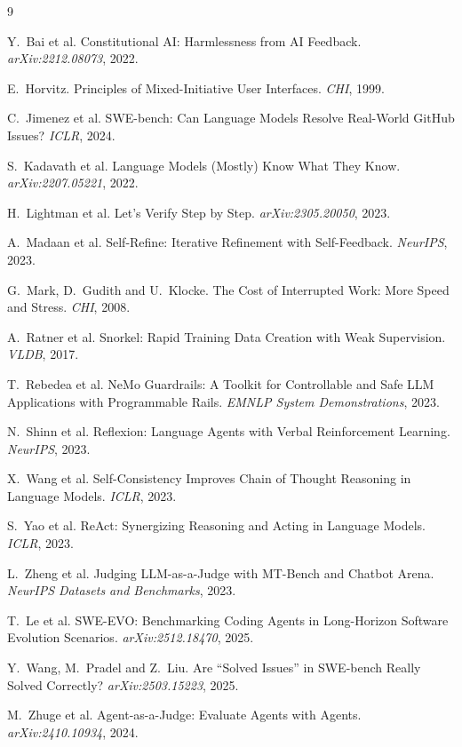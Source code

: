 
\begin{thebibliography}{9}

Y.~Bai et al.
\newblock Constitutional AI: Harmlessness from AI Feedback.
\newblock \emph{arXiv:2212.08073}, 2022.

E.~Horvitz.
\newblock Principles of Mixed-Initiative User Interfaces.
\newblock \emph{CHI}, 1999.

C.~Jimenez et al.
\newblock SWE-bench: Can Language Models Resolve Real-World GitHub Issues?
\newblock \emph{ICLR}, 2024.

S.~Kadavath et al.
\newblock Language Models (Mostly) Know What They Know.
\newblock \emph{arXiv:2207.05221}, 2022.

H.~Lightman et al.
\newblock Let's Verify Step by Step.
\newblock \emph{arXiv:2305.20050}, 2023.

A.~Madaan et al.
\newblock Self-Refine: Iterative Refinement with Self-Feedback.
\newblock \emph{NeurIPS}, 2023.

G.~Mark, D.~Gudith and U.~Klocke.
\newblock The Cost of Interrupted Work: More Speed and Stress.
\newblock \emph{CHI}, 2008.

A.~Ratner et al.
\newblock Snorkel: Rapid Training Data Creation with Weak Supervision.
\newblock \emph{VLDB}, 2017.

T.~Rebedea et al.
\newblock NeMo Guardrails: A Toolkit for Controllable and Safe LLM Applications
with Programmable Rails.
\newblock \emph{EMNLP System Demonstrations}, 2023.

N.~Shinn et al.
\newblock Reflexion: Language Agents with Verbal Reinforcement Learning.
\newblock \emph{NeurIPS}, 2023.

X.~Wang et al.
\newblock Self-Consistency Improves Chain of Thought Reasoning in Language Models.
\newblock \emph{ICLR}, 2023.

S.~Yao et al.
\newblock ReAct: Synergizing Reasoning and Acting in Language Models.
\newblock \emph{ICLR}, 2023.

L.~Zheng et al.
\newblock Judging LLM-as-a-Judge with MT-Bench and Chatbot Arena.
\newblock \emph{NeurIPS Datasets and Benchmarks}, 2023.


T.~Le et al.
\newblock SWE-EVO: Benchmarking Coding Agents in Long-Horizon Software Evolution Scenarios.
\newblock \emph{arXiv:2512.18470}, 2025.

Y.~Wang, M.~Pradel and Z.~Liu.
\newblock Are ``Solved Issues'' in SWE-bench Really Solved Correctly?
\newblock \emph{arXiv:2503.15223}, 2025.

M.~Zhuge et al.
\newblock Agent-as-a-Judge: Evaluate Agents with Agents.
\newblock \emph{arXiv:2410.10934}, 2024.

\end{thebibliography}
